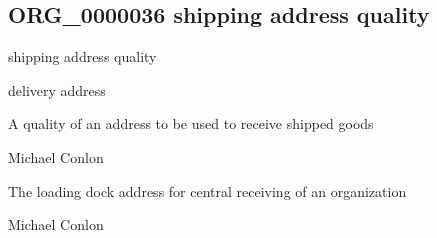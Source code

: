 \documentclass[letterpaper,10pt,english]{sphinxmanual}
\begin{document}
\subsection{ORG\_0000036 \sphinxhyphen{} shipping address quality}
\label{\detokenize{doc-ORG_0000036:org-0000036-shipping-address-quality}}\label{\detokenize{doc-ORG_0000036:index-0}}\label{\detokenize{doc-ORG_0000036::doc}}
\begin{sphinxShadowBox}

\sphinxAtStartPar
shipping address quality
\end{sphinxShadowBox}

\begin{sphinxShadowBox}

\sphinxAtStartPar
delivery address
\end{sphinxShadowBox}

\begin{sphinxShadowBox}

\sphinxAtStartPar
{\hyperref[\detokenize{doc-BFO_0000019::doc}]{}}
\end{sphinxShadowBox}

\begin{sphinxShadowBox}

\sphinxAtStartPar
A quality of an address to be used to receive shipped goods
\end{sphinxShadowBox}

\begin{sphinxShadowBox}

\sphinxAtStartPar
Michael Conlon 
\end{sphinxShadowBox}

\begin{sphinxShadowBox}

\sphinxAtStartPar
The loading dock address for central receiving of an organization
\end{sphinxShadowBox}

\begin{sphinxShadowBox}

\sphinxAtStartPar
Michael Conlon 
\end{sphinxShadowBox}
\begin{quote}

\ignorespaces \end{quote}
\end{document}
